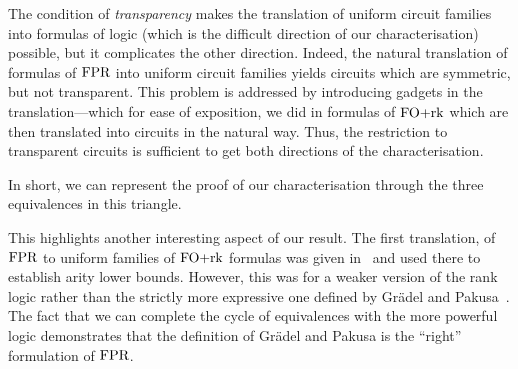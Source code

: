 \documentclass[a4paper,UKenglish]{lipics-v2018}
\begin{document}

The condition of \emph{transparency} makes the translation of uniform circuit families
into formulas of logic (which is the difficult direction of our
characterisation) possible, but it complicates the other direction. Indeed, the
natural translation of formulas of $\text{\upshape FPR}$ into uniform circuit families yields
circuits which are symmetric, but not transparent. This problem is addressed by
introducing gadgets in the translation---which for ease of exposition, we did in
formulas of $\text{\upshape FO+rk}$ which are then translated into circuits in the natural way.
Thus, the restriction to transparent circuits is sufficient to get both
directions of the characterisation. 

In short, we can represent the proof of our characterisation through the three
equivalences in this triangle.

\begin{center}
\end{center}

This highlights another interesting aspect of our result. The first translation,
of $\text{\upshape FPR}$ to uniform families of $\text{\upshape FO+rk}$ formulas was given
in~\cite{Dawar09logicswith} and used there to establish arity lower bounds.
However, this was for a weaker version of the rank logic rather than the
strictly more expressive one defined by Gr\"{a}del and Pakusa~\cite{GradelP15a}.
The fact that we can complete the cycle of equivalences with the more powerful
logic demonstrates that the definition of Gr\"{a}del and Pakusa is the ``right''
formulation of $\text{\upshape FPR}$.
\end{document}
